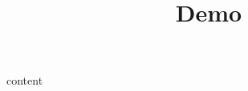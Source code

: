 \documentclass{article}
\title{Demo}
\begin{document}
\maketitle

\tableofcontents
\clearpage

{{{content}}}
\end{document}
